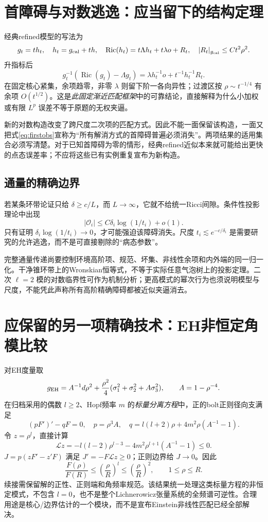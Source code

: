 \documentclass[UTF8,a4paper,11pt,fontset=fandol]{ctexart}
\numberwithin{equation}{section}
\theoremstyle{definition}
\newcommand{\Ric}{\operatorname{Ric}}
\begin{document}
\section{首障碍与对数逃逸：应当留下的结构定理}
经典refined模型的写法为
\[
g_t=t h_t,\quad h_t=g_{\rm cal}+th,\quad
\Ric(h_t)=t\Lambda h_t+t\lambda o+R_t,
\quad |R_t|_{g_{\rm cal}}\le Ct^2\rho^2.
\]
升指标后
\begin{equation}\label{eq:firstobs}
g_t^{-1}(\Ric(g_t)-\Lambda g_t)
=\lambda h_t^{-1}o+t^{-1}h_t^{-1}R_t.
\end{equation}
在固定核心紧集，余项趋零，非零 $\lambda$ 则留下阶一各向异性；过渡区按 $\rho\sim t^{-1/4}$ 有余项 $O(t^{1/2})$。这是\emph{此固定渐近匹配框架}中的可靠结论，直接解释为什么小加权或有限 $L^p$ 误差不等于原题的无权夹逼\cite{MV,Biquard}。

新的对数构造改变了跨尺度二次项的匹配方式。因此不能一面保留该构造，一面又把式\eqref{eq:firstobs}宣称为“所有解消方式的首障碍普遍必须消失”。两项结果的适用集合必须写清楚。对于已知首障碍为零的情形，经典refined近似本来就可能给出更快的点态误差率；不应将这些已有实例重复宣布为新构造。

\subsection{通量的精确边界}
若某条环带论证只给 $\delta\ge c/L$，而 $L\to\infty$，它就不给统一Ricci间隙。条件性投影理论中出现
\[
|\mathcal O_i|\le C\delta_i\log(1/t_i)+o(1).
\]
只有证明 $\delta_i\log(1/t_i)\to0$，才可能强迫该障碍消失。尺度 $t_i\lesssim e^{-c/\delta_i}$ 是需要研究的允许逃逸，而不是可直接剔除的“病态参数”。

完整通量传递尚要控制环境高阶项、规范、坏集、非线性余项和内外端的同一归一化。干净锥环带上的Wronskian恒等式，不等于实际任意气泡树上的投影定理。二次 $\ell=2$ 模的对数临界性可作为机制分析；更高模式的幂次行为也须说明模型与尺度，不能凭此声称所有高阶精确障碍都被近似夹逼消去。

\section{应保留的另一项精确技术：EH非恒定角模比较}
对EH度量取
\[
g_{\rm EH}=A^{-1}d\rho^2+\frac{\rho^2}{4}
(\sigma_1^2+\sigma_2^2+A\sigma_3^2),\qquad A=1-\rho^{-4}.
\]
在归档采用的偶数 $l\ge2$、Hopf频率 $m$ 的\emph{标量分离方程}中，正的bolt正则径向支满足
\[
(pF')'-qF=0,\quad p=\rho^3A,\quad
q=l(l+2)\rho+4m^2\rho(A^{-1}-1).
\]
令 $z=\rho^l$，直接计算
\[
\mathcal Lz=-l(l-2)\rho^{l-3}-4m^2\rho^{l+1}(A^{-1}-1)\le0.
\]
$J=p(zF'-z'F)$ 满足 $J'=-F\mathcal Lz\ge0$；正则边界给 $J\to0$。因此
\begin{equation}\label{eq:angular}
\frac{F(\rho)}{F(R)}\le\left(\frac{\rho}{R}\right)^l
\le\left(\frac{\rho}{R}\right)^2,\qquad1\le\rho\le R.
\end{equation}
续接需保留解的正性、正则端和角频率规范。该结果统一处理这类标量方程的非恒定模式，不包含 $l=0$，也不是整个Lichnerowicz张量系统的全频谱可逆性。合理用途是核心/边界估计的一个模块，而不是宣布Einstein非线性匹配已经全部解决。
\end{document}
